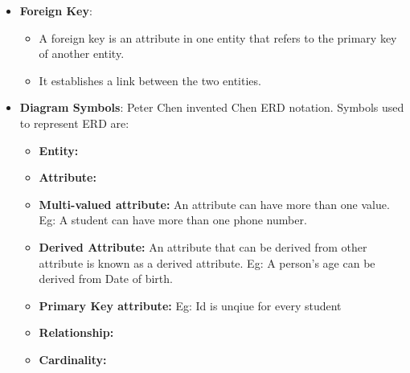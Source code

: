 \begin{flushleft}
\begin{itemize}
\begin{itemize}
			
			\item \textbf{Foreign Key}: 
			\begin{itemize}
				\item A foreign key is an attribute in one entity that refers to the primary key of another entity. 
				\item It establishes a link between the two entities.
			\end{itemize}
			
			\bigskip
			
			\newpage
			\item \textbf{Diagram Symbols}: Peter Chen invented Chen ERD notation. Symbols used to represent ERD are:
			\bigskip
			\begin{itemize}
				\item \textbf{Entity:}
				\item \textbf{Attribute:}
				\item \textbf{Multi-valued attribute:} An attribute can have more than one value. 
				\newline
				Eg: A student can have more than one phone number.
				\item \textbf{Derived Attribute:} An attribute that can be derived from other attribute is known as a derived attribute. 
				\newline
				Eg:  A person's age can be derived from Date of birth.
				\newpage
				\item \textbf{Primary Key attribute:}
				\newline
				Eg: Id is unqiue for every student
				\newpage
				\item \textbf{Relationship:}
				\item \textbf{Cardinality:}
			\end{itemize}
		\end{itemize}
	\end{itemize}
	
	
		
	
	
\end{flushleft}

\newpage